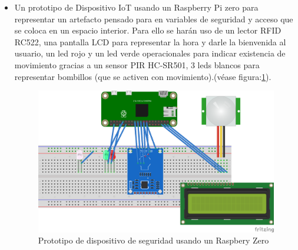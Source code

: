 \begin{itemize}
\item Un prototipo de Dispositivo IoT usando un Raspberry Pi zero para representar un artefacto pensado para en variables de seguridad y acceso que se coloca en un espacio interior. Para ello se harán uso de un lector RFID RC522, una pantalla LCD para representar la hora y darle la bienvenida al usuario, un led rojo y un led verde operacionales para indicar existencia de movimiento gracias a un sensor PIR HC-SR501, 3 leds blancos para representar bombillos (que se activen con movimiento).(véase figura:\ref{fig:rpizero_diagram}).
\begin{figure}[htb]
\centering
\includegraphics[scale=0.5]{./Figuras/rpizero_diagram.png}
\caption{Prototipo de dispositivo de seguridad usando un Raspbery Zero}
\label{fig:rpizero_diagram}
\vspace*{-10pt}
\end{figure}


\end{itemize}
